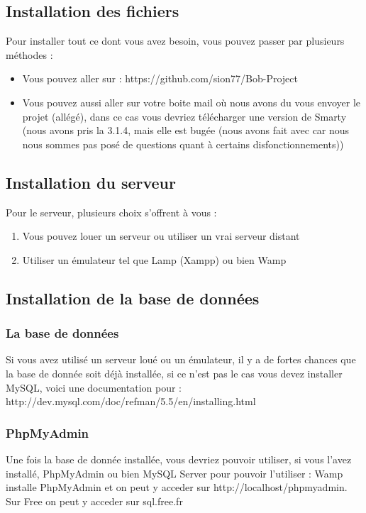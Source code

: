 
\subsection{Installation des fichiers}
	Pour installer tout ce dont vous avez besoin, vous pouvez passer par plusieurs méthodes :

\begin{itemize}
	\item Vous pouvez aller sur : https://github.com/sion77/Bob-Project
	\item Vous pouvez aussi aller sur votre boite mail où nous avons du vous envoyer le projet (allégé), dans ce cas vous devriez télécharger une version de Smarty (nous avons pris la 3.1.4, mais elle est bugée (nous avons fait avec car nous nous sommes pas posé de questions quant à certains disfonctionnements))
\end{itemize}

\subsection{Installation du serveur}
	Pour le serveur, plusieurs choix s'offrent à vous :
	\begin{enumerate}
		\item Vous pouvez louer un serveur ou utiliser un vrai serveur distant
		\item Utiliser un émulateur tel que Lamp (Xampp) ou bien Wamp
	\end{enumerate}

\subsection{Installation de la base de données}

	\subsubsection{La base de données}
	
	Si vous avez utilisé un serveur loué ou un émulateur, il y a de fortes chances que la base de donnée soit déjà installée, si ce n'est pas le cas
vous devez installer MySQL, voici une documentation pour : http://dev.mysql.com/doc/refman/5.5/en/installing.html\\

	\subsubsection{PhpMyAdmin}
	Une fois la base de donnée installée, vous devriez pouvoir utiliser, si vous l'avez installé, PhpMyAdmin ou bien MySQL Server pour pouvoir l'utiliser : Wamp installe PhpMyAdmin et on peut y acceder sur http://localhost/phpmyadmin.\\
	Sur Free on peut y acceder sur sql.free.fr
	
